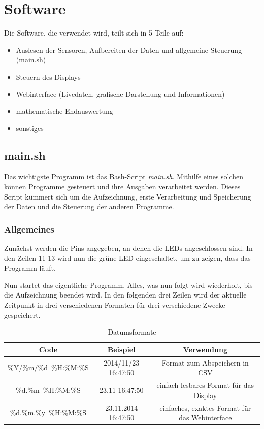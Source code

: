 \chapter{Software}
Die Software, die verwendet wird, teilt sich in 5 Teile auf:
\begin{itemize}
\item Auslesen der Sensoren, Aufbereiten der Daten und allgemeine Steuerung (main.sh)
\item Steuern des Displays
\item Webinterface (Livedaten, grafische Darstellung und Informationen)
\item mathematische Endauswertung
\item sonstiges
\end{itemize}

\section{main.sh}
\label{sec:main.sh}

Das wichtigste Programm ist das \gls{Bash}-Script \textit{main.sh}. Mithilfe eines solchen können Programme gesteuert und ihre Ausgaben verarbeitet werden. Dieses Script kümmert sich um die Aufzeichnung, erste Verarbeitung und Speicherung der Daten und die Steuerung der anderen Programme. 

\subsection{Allgemeines}
\label{subsec:main.sh/allgemeines}

Zunächst werden die Pins angegeben, an denen die \gls{LED}s angeschlossen sind. In den Zeilen 11-13 wird nun die grüne \gls{LED} eingeschaltet, um zu zeigen, dass das Programm läuft.

Nun startet das eigentliche Programm. Alles, was nun folgt wird wiederholt, bis die Aufzeichnung beendet wird.
In den folgenden drei Zeilen wird der aktuelle Zeitpunkt in drei verschiedenen Formaten für drei verschiedene Zwecke gespeichert.
\begin{table}[h]
	\centering
	\begin{tabulary}{\textwidth}{C|C|C}
		Code & Beispiel & Verwendung \\
		\hline
		\hline
		\%Y/\%m/\%d\ \%H:\%M:\%S & 2014/11/23 16:47:50 & Format zum Abspeichern in \gls{CSV} \\
		\hline
		\%d.\%m\ \%H:\%M:\%S & 23.11 16:47:50 & einfach lesbares Format für das Display \\
		\hline
		\%d.\%m.\%y\ \%H:\%M:\%S & 23.11.2014 16:47:50 & einfaches, exaktes Format für das Webinterface \\
	\end{tabulary}
	\caption{Datumsformate}
\end{table}

